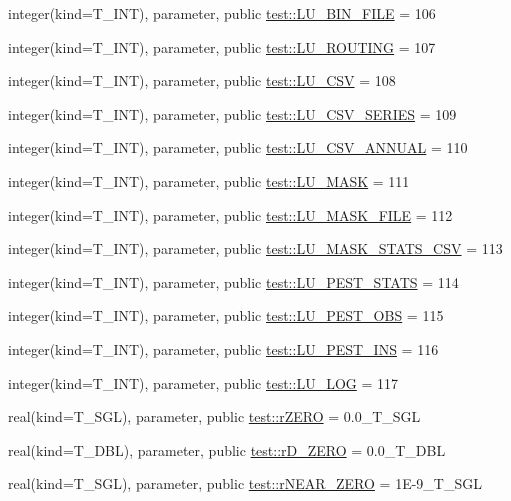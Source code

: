 \begin{DoxyCompactItemize}
\item 
integer(kind=T\_\-INT), parameter, public \hyperlink{namespacetest_ad2384d4c6037155a8ec2549d1d0bcfe4}{test::LU\_\-BIN\_\-FILE} = 106
\item 
integer(kind=T\_\-INT), parameter, public \hyperlink{namespacetest_a70f553900e15e79d97a1515e6550c1e7}{test::LU\_\-ROUTING} = 107
\item 
integer(kind=T\_\-INT), parameter, public \hyperlink{namespacetest_ad63b2c5042d42739d03ca38d8ec6f417}{test::LU\_\-CSV} = 108
\item 
integer(kind=T\_\-INT), parameter, public \hyperlink{namespacetest_aaf67717999e2b4cc413c0fe565f31c80}{test::LU\_\-CSV\_\-SERIES} = 109
\item 
integer(kind=T\_\-INT), parameter, public \hyperlink{namespacetest_a37ce335b13c6fe95c470ba7b67c88f92}{test::LU\_\-CSV\_\-ANNUAL} = 110
\item 
integer(kind=T\_\-INT), parameter, public \hyperlink{namespacetest_a6d15f5ccef6a1936e7fdfa3f785a97f7}{test::LU\_\-MASK} = 111
\item 
integer(kind=T\_\-INT), parameter, public \hyperlink{namespacetest_a4ef1befc57b809909da2a4f3bdb5853d}{test::LU\_\-MASK\_\-FILE} = 112
\item 
integer(kind=T\_\-INT), parameter, public \hyperlink{namespacetest_a494f7cd02f5647d3dd40276d2a080e09}{test::LU\_\-MASK\_\-STATS\_\-CSV} = 113
\item 
integer(kind=T\_\-INT), parameter, public \hyperlink{namespacetest_a9a71f73b35c56ff97dfc0c438945e783}{test::LU\_\-PEST\_\-STATS} = 114
\item 
integer(kind=T\_\-INT), parameter, public \hyperlink{namespacetest_a3b43ad5b8d9f36d9e1cfdf94bc02d83f}{test::LU\_\-PEST\_\-OBS} = 115
\item 
integer(kind=T\_\-INT), parameter, public \hyperlink{namespacetest_a0796d8d42c3fd32614b1f4ac37aa21cf}{test::LU\_\-PEST\_\-INS} = 116
\item 
integer(kind=T\_\-INT), parameter, public \hyperlink{namespacetest_a6f591abb1742ac7c55e5146938c8d81f}{test::LU\_\-LOG} = 117
\item 
real(kind=T\_\-SGL), parameter, public \hyperlink{namespacetest_a9bd8aefd97474e9bd8eb52d36c5d1ea2}{test::rZERO} = 0.0\_\-T\_\-SGL
\item 
real(kind=T\_\-DBL), parameter, public \hyperlink{namespacetest_a4bd8ceae51c320c4ba797c783a5421a9}{test::rD\_\-ZERO} = 0.0\_\-T\_\-DBL
\item 
real(kind=T\_\-SGL), parameter, public \hyperlink{namespacetest_ad2e23effbad4134a648b3e3694400190}{test::rNEAR\_\-ZERO} = 1E-\/9\_\-T\_\-SGL

\end{DoxyCompactItemize}
